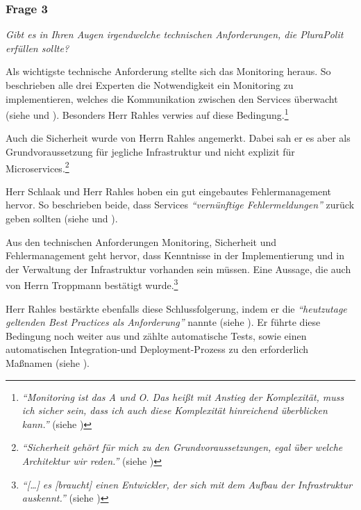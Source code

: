 \subsubsection{Frage 3}
\label{sec:frage3}

\textit{Gibt es in Ihren Augen irgendwelche technischen Anforderungen, die PluraPolit erfüllen sollte?}

Als wichtigste technische Anforderung stellte sich das Monitoring heraus. So beschrieben alle drei Experten die Notwendigkeit ein Monitoring zu implementieren, welches die Kommunikation zwischen den Services überwacht (siehe  und ). Besonders Herr Rahles verwies auf diese Bedingung.\footnote{
\textit{\enquote{Monitoring ist das A und O. Das heißt mit Anstieg der Komplexität, muss ich sicher sein, dass ich auch diese Komplexität hinreichend überblicken kann.}} (siehe )
}

Auch die Sicherheit wurde von Herrn Rahles angemerkt. Dabei sah er es aber als Grundvoraussetzung für jegliche Infrastruktur und nicht explizit für Microservices.\footnote{
\textit{\enquote{Sicherheit gehört für mich zu den Grundvoraussetzungen, egal über welche Architektur wir reden.}} (siehe )
}

Herr Schlaak und Herr Rahles hoben ein gut eingebautes Fehlermanagement hervor. So beschrieben beide, dass Services \textit{\enquote{vernünftige Fehlermeldungen}} zurück geben sollten (siehe  und ).

Aus den technischen Anforderungen Monitoring, Sicherheit und Fehlermanagement geht hervor, dass Kenntnisse in der Implementierung und in der Verwaltung der Infrastruktur vorhanden sein müssen. Eine Aussage, die auch von Herrn Troppmann bestätigt wurde.\footnote{
\textit{\enquote{[…] es [braucht] einen Entwickler, der sich mit dem Aufbau der Infrastruktur auskennt.}} (siehe )
}

Herr Rahles bestärkte ebenfalls diese Schlussfolgerung, indem er die \textit{\enquote{heutzutage geltenden Best Practices als Anforderung}} nannte (siehe ). Er führte diese Bedingung noch weiter aus und zählte automatische Tests, sowie einen automatischen Integration-\footnotemark und Deployment-Prozess zu den erforderlich Maßnamen (siehe ).

